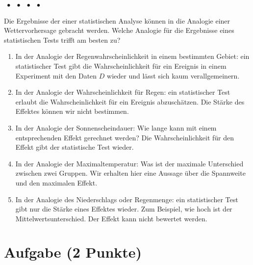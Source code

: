 \documentclass[a4paper, 9pt]{scrartcl}\usepackage[]{graphicx}\usepackage[]{xcolor}
\begin{document}
{%
\ifcollection
\begin{flushright}
\tiny\vspace{-2Ex}
\textbf{\examinhaltstart}
\exammodulemathstat $\;\bullet$
\exammodulestat $\;\bullet$
\exammodulestatbbv $\;\bullet$
\exammodulestatversuch $\;\bullet$
\exammodulebiostat
\vspace{-1Ex}
\end{flushright}
\fi




Die Ergebnisse der einer statistischen Analyse können in die Analogie einer Wettervorhersage gebracht werden. Welche Analogie für die Ergebnisse eines statistischen Tests trifft am besten zu?



\begin{enumerate}
\item [\textbf{A} \msquare] In der Analogie der Regenwahrscheinlichkeit in einem bestimmten Gebiet: ein statistischer Test gibt die Wahrscheinlichkeit für ein Ereignis in einem Experiment mit den Daten $D$ wieder und lässt sich kaum verallgemeinern.
\item [\textbf{B} \msquare] In der Analogie der Wahrscheinlichkeit für Regen: ein statistischer Test erlaubt die Wahrscheinlichkeit für ein Ereignis abzuschätzen. Die Stärke des Effektes können wir nicht bestimmen.
\item [\textbf{C} \msquare] In der Analogie der Sonnenscheindauer: Wie lange kann mit einem entsprechenden Effekt gerechnet werden? Die Wahrscheinlichkeit für den Effekt gibt der statistische Test wieder.
\item [\textbf{D} \msquare] In der Analogie der Maximaltemperatur: Was ist der maximale Unterschied zwischen zwei Gruppen. Wir erhalten hier eine Aussage über die Spannweite und den maximalen Effekt.
\item [\textbf{E} \msquare] In der Analogie des Niederschlags oder Regenmenge: ein statistischer Test gibt nur die Stärke eines Effektes wieder. Zum Beispiel, wie hoch ist der Mittelwertsunterschied. Der Effekt kann nicht bewertet werden.
\end{enumerate} 

\section{Aufgabe \hfill (2 Punkte)}

}
\end{document}
